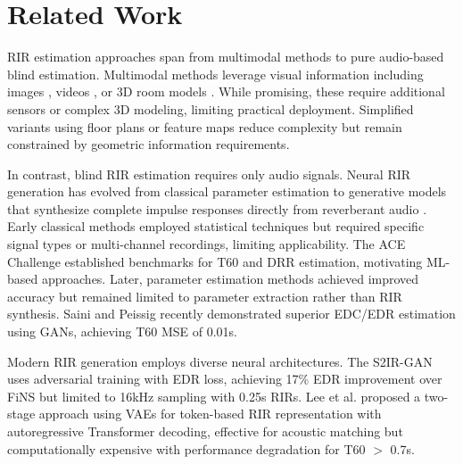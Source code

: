 \documentclass[conference]{IEEEtran}
\begin{document}
 
\section{Related Work}
 
RIR estimation approaches span from multimodal methods to pure audio-based blind estimation. Multimodal methods leverage visual information including images \cite{chen2022imageRIR,nikhil2021image2RIR}, videos \cite{garg2021videoRIR,liang2023avnerfVid2RIR}, or 3D room models \cite{tang2020model3dgraphics}. While promising, these require additional sensors or complex 3D modeling, limiting practical deployment. Simplified variants using floor plans \cite{lundin2022grundriss} or feature maps \cite{falcon2021featureMaps} reduce complexity but remain constrained by geometric information requirements.
 
In contrast, blind RIR estimation requires only audio signals. Neural RIR generation has evolved from classical parameter estimation \cite{gamper2018blind, looney2020} to  generative models that synthesize complete impulse responses directly from reverberant audio \cite{steinmetz2021filtered, ratnarajah2023towards, lee2023yet}. Early classical methods \cite{lin2006bayesian, crammer2006room} employed statistical techniques but required specific signal types or multi-channel recordings, limiting applicability. The ACE Challenge \cite{eaton2016estimationACE} established benchmarks for T60 and DRR estimation, motivating ML-based approaches. Later, parameter estimation methods \cite{gamper2018blind, looney2020, bryan2020impulse, gotz2022} achieved improved accuracy but remained limited to parameter extraction rather than RIR synthesis. Saini and Peissig \cite{saini2024EDC} recently demonstrated superior EDC/EDR estimation using GANs, achieving T60 MSE of 0.01s.
 
Modern RIR generation employs diverse neural architectures. The S2IR-GAN \cite{ratnarajah2023towards} uses adversarial training with EDR loss, achieving 17\% EDR improvement over FiNS but limited to 16kHz sampling with 0.25s RIRs. Lee et al. \cite{lee2023yet} proposed a two-stage approach using VAEs for token-based RIR representation with autoregressive Transformer decoding, effective for acoustic matching but computationally expensive with performance degradation for T60 $>$ 0.7s. 
 
\end{document}
